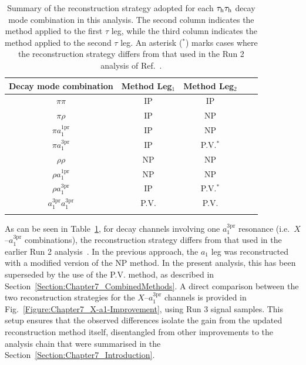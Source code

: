 \begin{table}[!htbp]
\centering
\renewcommand{\arraystretch}{1.5} %
\setlength{\tabcolsep}{10pt} %
\begin{tabular}{ccccc}
\hline
Decay mode combination & Method Leg$_1$ & Method Leg$_2$\\
\hline
$\pi\pi$       & \ac{IP} & \ac{IP} \\
\arrayrulecolor{lightgray} \hline
$\pi\rho$       & \ac{IP} & \ac{NP} \\
\arrayrulecolor{lightgray} \hline
$\pi a_1^\text{1pr}$       & \ac{IP} & \ac{NP} \\
\arrayrulecolor{lightgray} \hline
$\pi a_1^\text{3pr}$       & \ac{IP} & \ac{P.V.}$^*$ \\
\arrayrulecolor{lightgray} \hline
$\rho\rho$       & \ac{NP} & \ac{NP} \\
\arrayrulecolor{lightgray} \hline
$\rho a_1^\text{1pr}$       & \ac{NP} & \ac{NP} \\
\arrayrulecolor{lightgray} \hline
$\rho a_1^\text{3pr}$       & \ac{IP} & \ac{P.V.}$^*$ \\
\arrayrulecolor{lightgray} \hline
$a_1^\text{3pr} a_1^\text{3pr}$       & \ac{P.V.} & \ac{P.V.} \\
\arrayrulecolor{black} \hline
\end{tabular}
\caption[Summary of reconstruction methods per $\tauh\tauh$ decay mode combination.]
{Summary of the reconstruction strategy adopted for each $\tauh\tauh$ decay mode combination in this analysis. The second column indicates the method applied to the first $\tau$ leg, while the third column indicates the method applied to the second $\tau$ leg. An asterisk ($^*$) marks cases where the reconstruction strategy differs from that used in the Run 2 analysis of Ref.~\cite{HiggsCP_CMS_2021}.}
\label{Table:Chapter7_ReconstructionMethodSummary}
\end{table}

As can be seen in Table~\ref{Table:Chapter7_ReconstructionMethodSummary}, for decay channels involving one $a_1^{3\mathrm{pr}}$ resonance (i.e.\ $X$–$a_1^{3\mathrm{pr}}$ combinations), the reconstruction strategy differs from that used in the earlier Run 2 analysis~\cite{HiggsCP_CMS_2021}. In the previous approach, the $a_1$ leg was reconstructed with a modified version of the \ac{NP} method. In the present analysis, this has been superseded by the use of the \ac{P.V.} method, as described in Section~\ref{Section:Chapter7_CombinedMethods}. A direct comparison between the two reconstruction strategies for the $X$–$a_1^{3\mathrm{pr}}$ channels is provided in Fig.~\ref{Figure:Chapter7_X-a1-Improvement}, using Run 3 signal samples. This setup ensures that the observed differences isolate the gain from the updated reconstruction method itself, disentangled from other improvements to the analysis chain that were summarised in the Section~\ref{Section:Chapter7_Introduction}.

